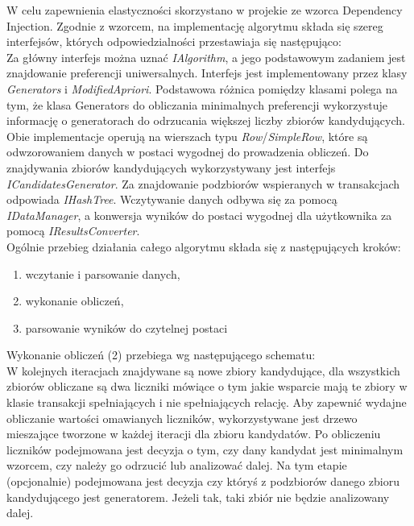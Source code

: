 \documentclass[a4paper,12pt]{article}
\begin{document}
W celu zapewnienia elastyczności skorzystano w projekie ze wzorca Dependency Injection. Zgodnie z wzorcem, na implementację algorytmu składa się szereg interfejsów, których odpowiedzialności przestawiaja się następująco:\\

Za główny interfejs można uznać \textit{IAlgorithm}, a jego podstawowym zadaniem jest znajdowanie preferencji uniwersalnych. Interfejs jest implementowany przez klasy \textit{Generators} i \textit{ModifiedApriori}. Podstawowa różnica pomiędzy klasami polega na tym, że klasa Generators do obliczania minimalnych preferencji wykorzystuje informację o generatorach do odrzucania większej liczby zbiorów kandydujących. Obie implementacje operują na wierszach
typu \textit{Row}/\textit{SimpleRow}, które są odwzorowaniem danych w postaci wygodnej do prowadzenia obliczeń. Do znajdywania zbiorów kandydujących wykorzystywany jest interfejs \textit{ICandidatesGenerator}. Za znajdowanie podzbiorów wspieranych w transakcjach odpowiada \textit{IHashTree}. Wczytywanie danych odbywa się za pomocą \textit{IDataManager}, a konwersja wyników do postaci wygodnej dla użytkownika za pomocą \textit{IResultsConverter}.\\

Ogólnie przebieg działania całego algorytmu składa się z następujących kroków:

\begin{enumerate}
\item wczytanie i parsowanie danych,
\item wykonanie obliczeń,
\item parsowanie wyników do czytelnej postaci
\end{enumerate}

Wykonanie obliczeń (2) przebiega wg następującego schematu:\\

W kolejnych iteracjach znajdywane są nowe zbiory kandydujące, dla wszystkich zbiorów obliczane są dwa liczniki mówiące o tym jakie wsparcie mają te zbiory w klasie transakcji spełniających i nie spełniających relację. Aby zapewnić wydajne obliczanie wartości omawianych liczników, wykorzystywane jest drzewo mieszające tworzone w każdej iteracji dla zbioru kandydatów. Po obliczeniu liczników podejmowana jest decyzja o tym, czy dany kandydat
jest minimalnym wzorcem, czy należy go odrzucić lub analizować dalej. Na tym etapie (opcjonalnie) podejmowana jest decyzja czy któryś z podzbiorów danego zbioru kandydującego jest generatorem. Jeżeli tak, taki zbiór nie będzie analizowany dalej.
\end{document}
